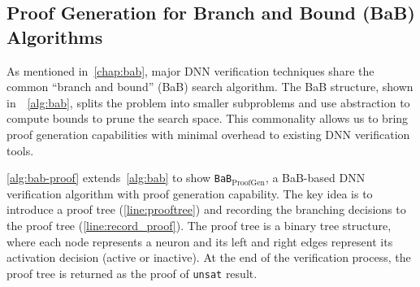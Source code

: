 \documentclass[oneside,11pt,dvipsnames]{book}
\numberwithin{equation}{section}
\theoremstyle{definition}
\theoremstyle{remark}
\newcommand{\proofgen}{\texttt{BaB$_{\text{ProofGen}}$}}
\newcommand{\neuralsat}{\texttt{NeuralSAT}}
\newcommand{\unsat}{\texttt{unsat}}
\begin{document}





\subsection{Proof Generation for Branch and Bound (BaB) Algorithms}\label{sec:proogen}

As mentioned in~\autoref{chap:bab}, major DNN verification techniques share the common ``branch and bound'' (BaB) search algorithm. The BaB structure, shown in~~\autoref{alg:bab}, splits the problem into smaller subproblems and use abstraction to compute bounds to prune the search space. This commonality allows us to bring proof generation capabilities with minimal overhead to existing DNN verification tools.

\autoref{alg:bab-proof} extends~\autoref{alg:bab} to show \proofgen, a BaB-based DNN verification algorithm with proof generation capability. The key idea is to introduce a proof tree (\autoref{line:prooftree}) and recording the branching decisions to the proof tree (\autoref{line:record_proof}).
The proof tree is a binary tree structure, where each node represents a neuron and its left and right edges represent its activation decision (active or inactive).
At the end of the verification process, the proof tree is returned as the proof of \unsat{} result.
\end{document}
